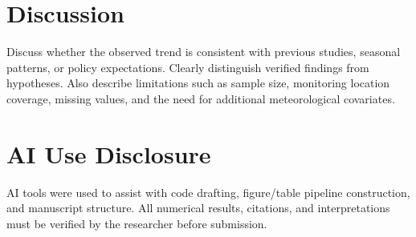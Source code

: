 \documentclass[12pt,a4paper]{article}
\begin{document}
\begin{table}[htbp]
    \centering
    \caption{Summary statistics for PM2.5 concentration.}
    \label{tab:summary-stats}
    
\end{table}

\section{Discussion}
Discuss whether the observed trend is consistent with previous studies, seasonal patterns, or policy expectations. Clearly distinguish verified findings from hypotheses. Also describe limitations such as sample size, monitoring location coverage, missing values, and the need for additional meteorological covariates.

\section*{AI Use Disclosure}
AI tools were used to assist with code drafting, figure/table pipeline construction, and manuscript structure. All numerical results, citations, and interpretations must be verified by the researcher before submission.



\end{document}
